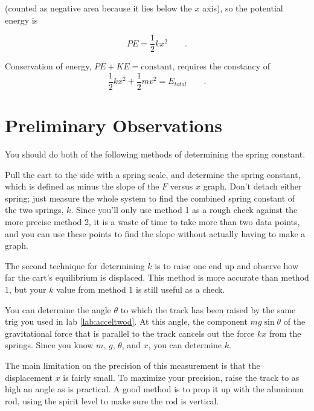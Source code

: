 (counted as negative area because it lies below the $x$
axis), so the potential energy is

\label{spring-constant}

\begin{equation*}
      PE  =   \frac{1}{2}kx^2  \qquad   .  
\end{equation*}

Conservation of energy, $PE+KE=\text{constant}$, requires the constancy of
\begin{equation*}
      \frac{1}{2}kx^2+\frac{1}{2}mv^2 = E_{total}  \qquad   .  
\end{equation*}

\section{Preliminary Observations}

You should do both of the following methods of determining
the spring constant.


Pull the cart to the side with a spring scale, and determine the spring constant,
which is defined as minus the slope of the $F$ versus $x$ graph.
Don't detach either spring; just measure the whole system
to find the combined spring constant of the two springs, $k$.
Since you'll only use method 1 as a rough check against the
more precise method 2, it is a waste of time to take more than two data points,
and you can use these points to find the slope without actually having to make
a graph.


The second technique for determining $k$ is to raise one end up
and observe how far the cart's equilibrium is displaced.
This method is more accurate than method 1, but your $k$ value from
method 1 is still useful as a check.

You can determine the angle $\theta$ to which the track has been raised by the same
trig you used in lab \ref{lab:acceltwod}. At this angle, the component $mg\sin\theta$
of the gravitational force that is parallel to the track cancels out the force
$kx$ from the springs. Since you know $m$, $g$, $\theta$, and $x$, you can determine
$k$.

The main limitation on the precision of this measurement is that the displacement $x$
is fairly small. To maximize your precision, raise the track to as high an angle as
is practical. A good method is to prop it up with the aluminum rod,
using the spirit level to make sure the rod is vertical.


